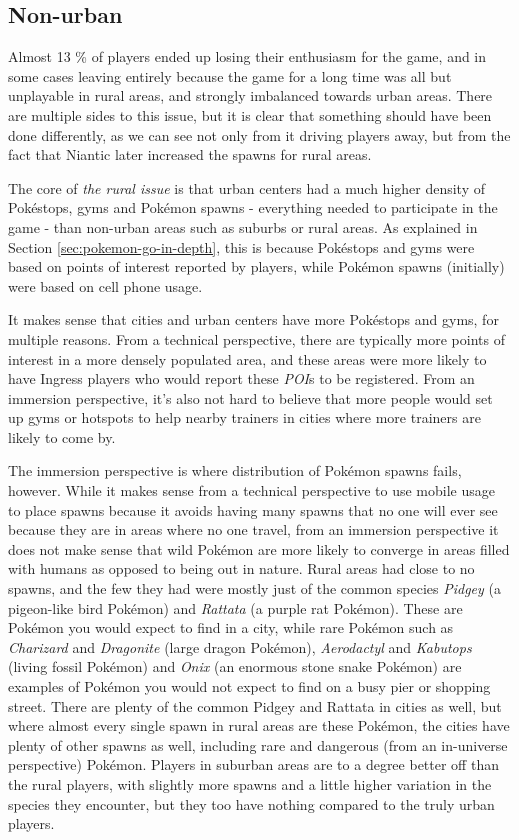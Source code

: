 \subsection{Non-urban}
\label{sec:the-rural-problem}
Almost 13 \% of players ended up losing their enthusiasm for the game, and in some cases leaving entirely because the game for a long time was all but unplayable in rural areas, and strongly imbalanced towards urban areas. There are multiple sides to this issue, but it is clear that something should have been done differently, as we can see not only from it driving players away, but from the fact that Niantic later increased the spawns for rural areas.

The core of \emph{the rural issue} is that urban centers had a much higher density of Pokéstops, gyms and Pokémon spawns - everything needed to participate in the game - than non-urban areas such as suburbs or rural areas. As explained in Section \ref{sec:pokemon-go-in-depth}, this is because Pokéstops and gyms were based on points of interest reported by players, while Pokémon spawns (initially) were based on cell phone usage.

It makes sense that cities and urban centers have more Pokéstops and gyms, for multiple reasons. From a technical perspective, there are typically more points of interest in a more densely populated area, and these areas were more likely to have Ingress players who would report these \emph{POI}s to be registered. From an immersion perspective, it's also not hard to believe that more people would set up gyms or hotspots to help nearby trainers in cities where more trainers are likely to come by.

The immersion perspective is where distribution of Pokémon spawns fails, however. While it makes sense from a technical perspective to use mobile usage to place spawns because it avoids having many spawns that no one will ever see because they are in areas where no one travel, from an immersion perspective it does not make sense that wild Pokémon are more likely to converge in areas filled with humans as opposed to being out in nature. Rural areas had close to no spawns, and the few they had were mostly just of the common species \emph{Pidgey} (a pigeon-like bird Pokémon) and \emph{Rattata} (a purple rat Pokémon). These are Pokémon you would expect to find in a city, while rare Pokémon such as \emph{Charizard} and \emph{Dragonite} (large dragon Pokémon), \emph{Aerodactyl} and \emph{Kabutops} (living fossil Pokémon) and \emph{Onix} (an enormous stone snake Pokémon) are examples of Pokémon you would not expect to find on a busy pier or shopping street. There are plenty of the common Pidgey and Rattata in cities as well, but where almost every single spawn in rural areas are these Pokémon, the cities have plenty of other spawns as well, including rare and dangerous (from an in-universe perspective) Pokémon. Players in suburban areas are to a degree better off than the rural players, with slightly more spawns and a little higher variation in the species they encounter, but they too have nothing compared to the truly urban players.

